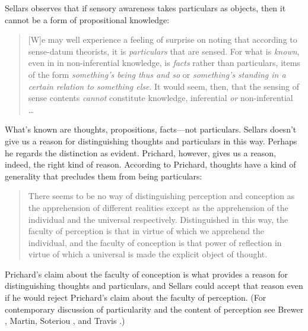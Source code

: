 \documentclass[12pt]{article}
\begin{document}
Sellars observes that if sensory awareness takes particulars as objects, then it cannot be a form of propositional knowledge:
\begin{quote}
	[W]e may well experience a feeling of surprise on noting that according to sense-datum theorists, it is \emph{particulars} that are sensed. For what is \emph{known}, even in in non-inferential knowledge, is \emph{facts} rather than particulars, items of the form \emph{something's being thus and so} or \emph{something's standing in a certain relation to something else}. It would seem, then, that the sensing of sense contents \emph{cannot} constitute knowledge, inferential \emph{or} non-inferential \ldots\ \citep[§3]{Sellars:1956xp}
\end{quote}
What's known are thoughts, propositions, facts\----\-not particulars. Sellars doesn't give us a reason for distinguishing thoughts and particulars in this way. Perhaps he regards the distinction as evident. Prichard, however, gives us a reason, indeed, the right kind of reason. According to Prichard, thoughts have a kind of generality that precludes them from being particulars:
\begin{quote}
	There seems to be no way of distinguishing perception and conception as the apprehension of different realities except as the apprehension of the individual and the universal respectively. Distinguished in this way, the faculty of perception is that in virtue of which we apprehend the individual, and the faculty of conception is that power of reflection in virtue of which a universal is made the explicit object of thought. \citep[]{Prichard:1909yg}
\end{quote}
Prichard's claim about the faculty of conception is what provides a reason for distinguishing thoughts and particulars, and Sellars could accept that reason even if he would reject Prichard's claim about the faculty of perception. (For contemporary discussion of particularity and the content of perception see Brewer \citeyear{Brewer:2008fk}, Martin, \citeyear{Martin:2002jb} Soteriou \citeyear{Soteriou:2000iz,Soteriou:2005fk}, and Travis \citeyear{Travis:2005ys}.)
\end{document}
